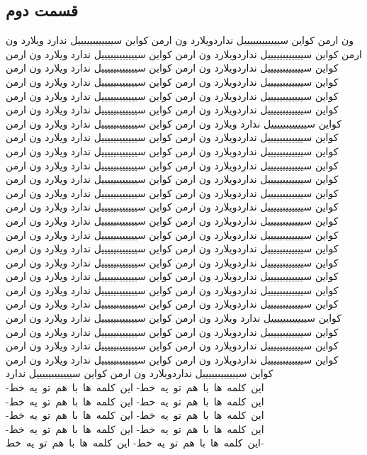\documentclass{book}
\begin{document}
	\subsection{قسمت دوم}
	ون ارمن کواین سییییییبیییییل نداردویلارد ون ارمن کواین سییییییبیییییل ندارد ویلارد ون ارمن کواین سییییییبیییییل نداردویلارد ون ارمن کواین سییییییبیییییل ندارد ویلارد ون ارمن کواین سییییییبیییییل نداردویلارد ون ارمن کواین سییییییبیییییل ندارد ویلارد ون ارمن کواین سییییییبیییییل نداردویلارد ون ارمن کواین سییییییبیییییل ندارد ویلارد ون ارمن کواین سییییییبیییییل نداردویلارد ون ارمن کواین سییییییبیییییل ندارد ویلارد ون ارمن کواین سییییییبیییییل نداردویلارد ون ارمن کواین سییییییبیییییل ندارد ویلارد ون ارمن کواین سییییییبیییییل ندارد
	ویلارد ون ارمن کواین سییییییبیییییل ندارد ویلارد ون ارمن کواین سییییییبیییییل نداردویلارد ون ارمن کواین سییییییبیییییل ندارد ویلارد ون ارمن کواین سییییییبیییییل نداردویلارد ون ارمن کواین سییییییبیییییل ندارد ویلارد ون ارمن کواین سییییییبیییییل نداردویلارد ون ارمن کواین سییییییبیییییل ندارد ویلارد ون ارمن کواین سییییییبیییییل نداردویلارد ون ارمن کواین سییییییبیییییل ندارد ویلارد ون ارمن کواین سییییییبیییییل نداردویلارد ون ارمن کواین سییییییبیییییل ندارد ویلارد ون ارمن کواین سییییییبیییییل نداردویلارد ون ارمن کواین سییییییبیییییل ندارد ویلارد ون ارمن کواین سییییییبیییییل نداردویلارد ون ارمن کواین سییییییبیییییل ندارد ویلارد ون ارمن کواین سییییییبیییییل نداردویلارد ون ارمن کواین سییییییبیییییل ندارد ویلارد ون ارمن کواین سییییییبیییییل نداردویلارد ون ارمن کواین سییییییبیییییل ندارد ویلارد ون ارمن کواین سییییییبیییییل نداردویلارد ون ارمن کواین سییییییبیییییل ندارد ویلارد ون ارمن کواین سییییییبیییییل نداردویلارد ون ارمن کواین سییییییبیییییل ندارد ویلارد ون ارمن کواین سییییییبیییییل نداردویلارد ون ارمن کواین سییییییبیییییل ندارد ویلارد ون ارمن کواین سییییییبیییییل نداردویلارد ون ارمن کواین سییییییبیییییل ندارد ویلارد ون ارمن کواین سییییییبیییییل ندارد ویلارد ون ارمن کواین سییییییبیییییل ندارد ویلارد ون ارمن کواین سییییییبیییییل نداردویلارد ون ارمن کواین سییییییبیییییل ندارد ویلارد ون ارمن کواین سییییییبیییییل نداردویلارد ون ارمن کواین سییییییبیییییل ندارد ویلارد ون ارمن کواین سییییییبیییییل نداردویلارد ون ارمن کواین سییییییبیییییل ندارد ویلارد ون ارمن کواین سییییییبیییییل نداردویلارد ون ارمن کواین سییییییبیییییل ندارد \mbox{این کلمه ها با هم تو یه خط-} \mbox{این کلمه ها با هم تو یه خط-} \mbox{این کلمه ها با هم تو یه خط-} \mbox{این کلمه ها با هم تو یه خط-} \mbox{این کلمه ها با هم تو یه خط-} \mbox{این کلمه ها با هم تو یه خط-} \mbox{این کلمه ها با هم تو یه خط-} \mbox{این کلمه ها با هم تو یه خط-} \mbox{این کلمه ها با هم تو یه خط-} \mbox{این کلمه ها با هم تو یه خط-}
	
\end{document}
